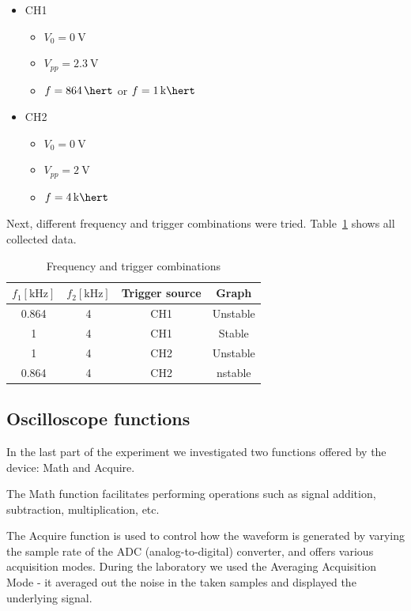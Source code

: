 \begin{itemize}
	\item CH1
	\begin{itemize}
		\item $V_{0} = \SI{0}{\volt}$
		\item $V_{pp} = \SI{2.3}{\volt}$
		\item $f = \SI{864}{\hert}$ or $f = \SI{1}{\kilo\hert}$
	\end{itemize}
	\item CH2
	\begin{itemize}
		\item $V_{0} = \SI{0}{\volt}$
		\item $V_{pp} = \SI{2}{\volt}$
		\item $f = \SI{4}{\kilo\hert}$
	\end{itemize}
\end{itemize}

Next, different frequency and trigger combinations were tried. Table~\ref{tab:triggering} shows all collected data.

\begin{table}[H]
	\centering
	\begin{tabular}{c|c|c|c}
		$f_{1} [\unit{\kilo\hertz}]$ & $f_{2} [\unit{\kilo\hertz}]$ & Trigger source & Graph\\
		\hline
		0.864 & 4 & CH1 & Unstable\\
		\hline
		1 & 4 & CH1 & Stable\\
		\hline
		1 & 4 & CH2 & Unstable\\
		\hline
		0.864 & 4 & CH2 & nstable\\
	\end{tabular}
	\caption{Frequency and trigger combinations}
	\label{tab:triggering}
\end{table}

\subsection{Oscilloscope functions}
In the last part of the experiment we investigated two functions offered by the device: Math and Acquire.

The Math function facilitates performing operations such as signal addition, subtraction, multiplication, etc.

The Acquire function is used to control how the waveform is generated by varying the sample rate of the ADC (analog-to-digital) converter, and offers various acquisition modes. During the laboratory we used the Averaging Acquisition Mode - it averaged out the noise in the taken samples and displayed the underlying signal.
